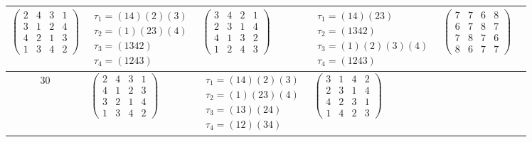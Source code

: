 \begin{longtable}{|c|p{2.7cm}|p{2.7cm}|p{2.7cm}|p{2.7cm}|p{2.7cm}|}
    $\begin{pmatrix} 2 & 4 & 3 & 1 \\ 3 & 1 & 2 & 4 \\ 4 & 2 & 1 & 3 \\ 1 & 3 & 4 & 2 \end{pmatrix}$               &
    $\begin{array}{l}\tau_{1}=(14)(2)(3)\\ \tau_{2}=(1)(23)(4)\\ \tau_{3}=(1342)\\ \tau_{4}=(1243)\end{array}$     &
    $\begin{pmatrix} 3 & 4 & 2 & 1 \\ 2 & 3 & 1 & 4 \\ 4 & 1 & 3 & 2 \\ 1 & 2 & 4 & 3 \end{pmatrix}$               &
    $\begin{array}{l}\tau_{1}=(14)(23)\\ \tau_{2}=(1342)\\ \tau_{3}=(1)(2)(3)(4)\\ \tau_{4}=(1243)\end{array}$     &
    $\begin{pmatrix} 7 & 7 & 6 & 8 \\ 6 & 7 & 8 & 7 \\ 7 & 8 & 7 & 6 \\ 8 & 6 & 7 & 7 \end{pmatrix}$                                                                                           \\
    \hline
    30                                                                                                             &
    $\begin{pmatrix} 2 & 4 & 3 & 1 \\ 4 & 1 & 2 & 3 \\ 3 & 2 & 1 & 4 \\ 1 & 3 & 4 & 2 \end{pmatrix}$               &
    $\begin{array}{l}\tau_{1}=(14)(2)(3)\\ \tau_{2}=(1)(23)(4)\\ \tau_{3}=(13)(24)\\ \tau_{4}=(12)(34)\end{array}$ &
    $\begin{pmatrix} 3 & 1 & 4 & 2 \\ 2 & 3 & 1 & 4 \\ 4 & 2 & 3 & 1 \\ 1 & 4 & 2 & 3 \end{pmatrix}$               &

\end{longtable}
